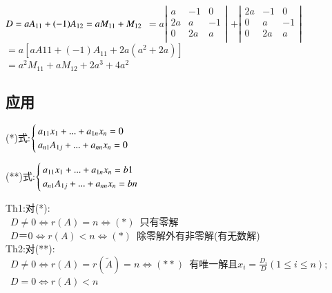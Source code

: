 \documentclass[printbox]{BHCexam}
\begin{document}
\begin{solution}
  $D=aA_{11}+(-1)A_{12}\\
  =aM_{11}+M_{12}\\$
$=a\left|                 %
  \begin{array}{ccc}   %
  a &-1&0\\
  2a&a&-1\\
0&2a&a\\
  \end{array}
  \right|$                 %
$+\left|                 %
  \begin{array}{ccc}   %
  \boxed{2a} &-1&0\\
  0&a&-1\\
0&2a&a\\
  \end{array}
  \right|$                 %
$=a[aA{11}+(-1)A_{11}+2a(a^2+2a)]$\\
$= a^2M_{11}+aM_{12}+2a^{3}+4a^2$

\end{solution} 

\subsection{应用}
(*)式:$\begin{cases}{}
  a_{11}x_1+...+a_{1n}x_{n}=0\\
  a_{n1}A_{1j}+...+a_{nn}x_{n}=0
   \end{cases}\\$

   (**)式:$\begin{cases}{}
    a_{11}x_1+...+a_{1n}x_{n}=b1\\
    a_{n1}A_{1j}+...+a_{nn}x_{n}=bn
     \end{cases}\\$


Th1:对(*):\\
~$D \neq 0\Longleftrightarrow r(A)=n \Longleftrightarrow
(*)$~只有零解\\
~$D ＝ 0\Longleftrightarrow r(A)<n \Longleftrightarrow
(*)$~除零解外有非零解(有无数解)\\
Th2:对(**):\\
~$D \neq 0\Longleftrightarrow r(A)=r(\widetilde{A})=n \Longleftrightarrow
(**)$~有唯一解且$x_i=\frac{D_i}{D}(1\leq i \leq n );$\\
~$D=0\Longleftrightarrow r(A)<n $
\end{document}
